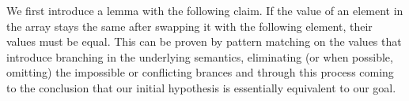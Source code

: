 We first introduce a lemma with the following claim. If the value of an element in the array stays the same after swapping it with the following element, their values must be equal.
This can be proven by pattern matching on the values that introduce branching in the underlying semantics, eliminating (or when possible, omitting) the impossible or conflicting brances and through this process coming to the conclusion that our initial hypothesis is essentially equivalent to our goal.

\begin{code}
    \>[0]\AgdaSpace{}%
    \AgdaSymbol{:}\AgdaSpace{}%
    \AgdaSymbol{\{}\AgdaSpace{}%
    \AgdaSymbol{:}\AgdaSpace{}%
    \AgdaSymbol{\}}\AgdaSpace{}%
    \<%
    \\
    \>[0][@{}l@{\AgdaIndent{0}}]%
    \>[2]\AgdaSpace{}%
    \AgdaSymbol{(}\AgdaSpace{}%
    \AgdaSymbol{)}\AgdaSpace{}%
    \AgdaSpace{}%
    \AgdaSpace{}%
    \AgdaSpace{}%
    \AgdaSymbol{(}\AgdaSpace{}%
    \AgdaSpace{}%
    \AgdaSpace{}%
    \AgdaSpace{}%
    \AgdaSpace{}%
    \AgdaSymbol{)}\AgdaSpace{}%
    \AgdaSpace{}%
    \<%
    \\
    \>[2]\AgdaSpace{}%
    \AgdaOperator{\AgdaFunction{v[}}\AgdaSpace{}%
    \AgdaSpace{}%
    \AgdaOperator{\AgdaFunction{]}}\AgdaSpace{}%
    \AgdaOperator{\AgdaFunction{g[}}\AgdaSpace{}%
    \AgdaSpace{}%
    \AgdaSpace{}%
    \AgdaOperator{\AgdaFunction{]}}\AgdaSpace{}%
    \AgdaSpace{}%
    \AgdaSpace{}%
    \AgdaSpace{}%
    \AgdaSpace{}%
    \AgdaOperator{\AgdaFunction{v[}}\AgdaSpace{}%
    \AgdaSpace{}%
    \AgdaOperator{\AgdaFunction{]}}\AgdaSpace{}%
    \AgdaOperator{\AgdaFunction{g[}}\AgdaSpace{}%
    \AgdaSpace{}%
    \AgdaSymbol{(}\AgdaSpace{}%
    \AgdaSymbol{)}\AgdaSpace{}%
    \AgdaOperator{\AgdaFunction{]}}\AgdaSpace{}%
    \AgdaSpace{}%
    \<%

\end{code}
